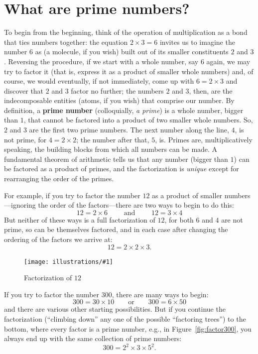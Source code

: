 \documentclass[11pt]{article}
\newcommand{\ill}[3]{ 
   \begin{figure}[H]
   \begin{center}
   \texttt{[image: illustrations/\#1]}
   \caption{#3}
   \end{center}
    \end{figure}
}
\theoremstyle{plain}
\theoremstyle{definition}
\numberwithin{equation}{section}
\numberwithin{figure}{section}
\numberwithin{table}{section}
\begin{document}
            \bigskip
            
\section{What are prime numbers?}
            

 To begin from the beginning, think
of the operation of multiplication as a bond that ties numbers
together: the equation $2\times 3= 6$ invites us to imagine the number
$6$ as (a molecule, if you wish) built out of its smaller constituents
$2$ and $3$.  Reversing the procedure, if we start with a whole
number, say $6$ again, we may try to factor it (that is, express it as
a product of smaller whole numbers) and, of course, we would
eventually, if not immediately, come up with $6 = 2\times 3$ and
discover that $2$ and $3$ factor no further; the numbers $2$ and $3$,
then, are the indecomposable entities (atoms, if you wish) that
comprise our number.  By definition, a {\bf prime number}
(colloquially, {\em a prime}) is a whole number, bigger than $1$, that
cannot be factored into a product of two smaller whole numbers. So,
$2$ and $3$ are the first two prime numbers. The next number along the
line, $4$, is not prime, for $4= 2\times 2$; the number after that,
$5$, is. Primes are, multiplicatively speaking, the building blocks
from which all numbers can be made. A fundamental theorem of
arithmetic tells us that any number (bigger than $1$) can be factored
as a product of primes, and the factorization is {\em unique} except
for rearranging the order of the primes. 

For example, if you try to factor the number $12$ as a product of
smaller numbers---ignoring the order of the factors---there are two
ways to begin to do this:
$$
  12 = 2 \times 6 \qquad\text{ and }\qquad   12 = 3 \times 4
$$
But neither of these ways is a full factorization of $12$, for both
$6$ and $4$ are not prime, so can be themselves factored, and in each
case after changing the ordering of the factors we arrive at:
$$
   12= 2 \times 2 \times 3.
$$
\ill{factor_tree_12}{0.5}{Factorization of $12$}

If you try to factor the number $300$, there are many
ways to begin:
$$
  300= 30\times 10\qquad\text{or}\qquad 300 = 6 \times 50
$$
and there are various other starting possibilities. But if you continue the factorization (``climbing down'' any one of 
the possible ``factoring trees'') to the bottom, where every factor is a prime number, e.g., in
Figure~\ref{fig:factor300},
you always end up with the same collection of prime numbers:                  
                 $$300 = 2^2\times 3\times 5^2.$$   
\end{document}
